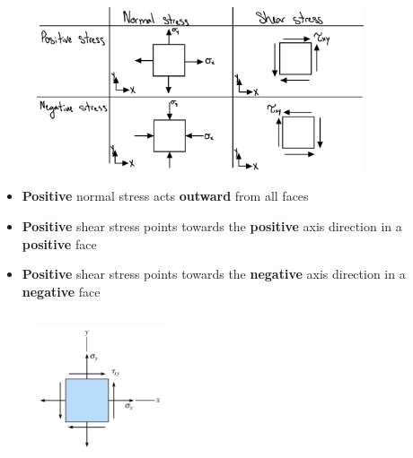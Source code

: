 \begin{figure}[!h]
\centering
\includegraphics[angle=0, width=3.8in]{Stress Transformation-Figures/Sign Convention.png}
\vspace{-2mm}
\caption{\small {}}
\vspace{-3mm}
\label{Fig:SignConvention}
\end{figure}

\begin{itemize}
    \item \textbf{Positive} normal stress acts \textbf{outward} from all faces
    \item \textbf{Positive} shear stress points towards the \textbf{positive} axis direction in a \textbf{positive} face
    \item \textbf{Positive} shear stress points towards the \textbf{negative} axis direction in a \textbf{negative} face
    
\end{itemize}

\subsection{}

\begin{figure}[!h]
\centering
\includegraphics[angle=0, width=1.5in]{Stress Transformation-Figures/Plane Stress.png}
\vspace{-2mm}
\caption{\small {}}
\vspace{-3mm}
\label{Fig:PlaneStress}
\end{figure}

